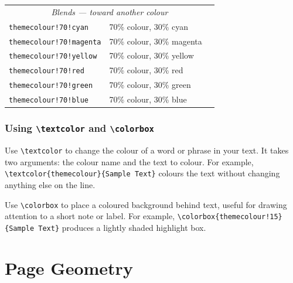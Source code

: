 \begin{tabularx}{\linewidth}{@{}llc@{}}
			\multicolumn{3}{c}{\textit{Blends --- toward another colour}} \\
			
			\texttt{themecolour!70!cyan}    & 70\% colour, 30\% cyan    & \colorbox{themecolour!70!cyan}{\phantom{XXXXX}} \\
			
			\texttt{themecolour!70!magenta} & 70\% colour, 30\% magenta & \colorbox{themecolour!70!magenta}{\phantom{XXXXX}} \\
			
			\texttt{themecolour!70!yellow}  & 70\% colour, 30\% yellow  & \colorbox{themecolour!70!yellow}{\phantom{XXXXX}} \\
			
			\texttt{themecolour!70!red}  	& 70\% colour, 30\% red  	& \colorbox{themecolour!70!red}{\phantom{XXXXX}} \\
			
			\texttt{themecolour!70!green}   & 70\% colour, 30\% green   & \colorbox{themecolour!75!green}{\phantom{XXXXX}} \\
			
			\texttt{themecolour!70!blue}  	& 70\% colour, 30\% blue  	& \colorbox{themecolour!70!blue}{\phantom{XXXXX}} \\
		\end{tabularx}
		
		\subsubsection{Using \texttt{\textbackslash textcolor} and \texttt{\textbackslash colorbox}}
		Use \texttt{\textbackslash textcolor} to change the colour of a word or phrase in your text. It takes two arguments: the colour name and the text to colour. For example, \textcolor{themecolour}{\texttt{\textbackslash textcolor\{themecolour\}\{Sample Text\}}} colours the text without changing anything else on the line.
		
		Use \texttt{\textbackslash colorbox} to place a coloured background behind text, useful for drawing attention to a short note or label. For example, \colorbox{themecolour!15}{\texttt{\textbackslash colorbox\{themecolour!15\}\{Sample Text\}}} produces a lightly shaded highlight box.

\section{Page Geometry}

